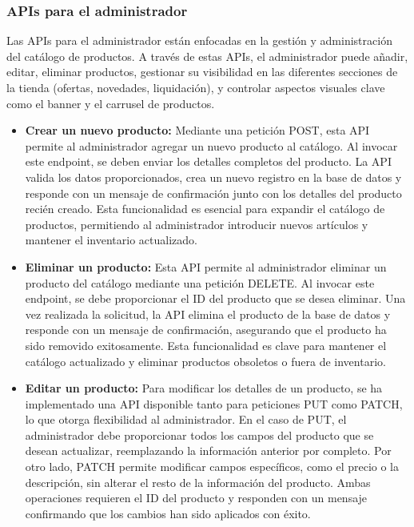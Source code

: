 \subsubsection{APIs para el administrador}\label{subsec5.3.2.2}
Las APIs para el administrador están enfocadas en la gestión y administración del catálogo de productos. A través de estas APIs, el administrador puede añadir, editar, eliminar productos, gestionar su visibilidad en las diferentes secciones de la tienda (ofertas, novedades, liquidación), y controlar aspectos visuales clave como el banner y el carrusel de productos.

\begin{itemize}

    \item \textbf{Crear un nuevo producto:} Mediante una petición POST, esta API permite al administrador agregar un nuevo producto al catálogo. Al invocar este endpoint, se deben enviar los detalles completos del producto. La API valida los datos proporcionados, crea un nuevo registro en la base de datos y responde con un mensaje de confirmación junto con los detalles del producto recién creado. Esta funcionalidad es esencial para expandir el catálogo de productos, permitiendo al administrador introducir nuevos artículos y mantener el inventario actualizado.
    
    \item \textbf{Eliminar un producto:} Esta API permite al administrador eliminar un producto del catálogo mediante una petición DELETE. Al invocar este endpoint, se debe proporcionar el ID del producto que se desea eliminar. Una vez realizada la solicitud, la API elimina el producto de la base de datos y responde con un mensaje de confirmación, asegurando que el producto ha sido removido exitosamente. Esta funcionalidad es clave para mantener el catálogo actualizado y eliminar productos obsoletos o fuera de inventario.
    
    \item \textbf{Editar un producto:} Para modificar los detalles de un producto, se ha implementado una API disponible tanto para peticiones PUT como PATCH, lo que otorga flexibilidad al administrador. En el caso de PUT, el administrador debe proporcionar todos los campos del producto que se desean actualizar, reemplazando la información anterior por completo. Por otro lado, PATCH permite modificar campos específicos, como el precio o la descripción, sin alterar el resto de la información del producto. Ambas operaciones requieren el ID del producto y responden con un mensaje confirmando que los cambios han sido aplicados con éxito.
    

\end{itemize}
